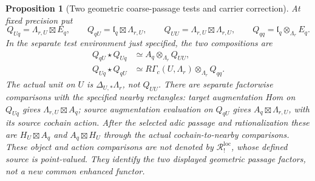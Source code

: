 \documentclass[11pt]{article}
\newtheorem{proposition}{Proposition}[section]
\theoremstyle{definition}
\theoremstyle{remark}
\begin{document}
\begin{proposition}[Two geometric coarse-passage tests and carrier correction]
\label{prop:normalized-root-passage}
At fixed precision put
\[
 Q_{Uq}=\Lambda_{r,U}\boxtimes E_q,\qquad
 Q_{qU}=\mathfrak l_q\boxtimes\Lambda_{r,U},\qquad
 Q_{UU}=\Lambda_{r,U}\boxtimes\Lambda_{r,U},\qquad
 Q_{qq}=\mathfrak l_q\otimes_{\Lambda_r}E_q.
\]
In the separate test environment just specified, the two compositions
are
\begin{align*}
 Q_{qU}\star Q_{Uq}&\simeq A_q\otimes_{\Lambda_r}Q_{UU},\\
 Q_{Uq}\star Q_{qU}&\simeq R\Gamma_c(U,\Lambda_r)
                                      \otimes_{\Lambda_r}Q_{qq}.
\end{align*}
The actual unit on $U$ is $\Delta_{U,*}\Lambda_r$, not $Q_{UU}$.
There are separate factorwise comparisons with the specified nearby
rectangles: target augmentation Hom on $Q_{Uq}$ gives
$\Lambda_{r,U}\boxtimes A_q$; source augmentation evaluation on
$Q_{qU}$ gives $A_q\boxtimes\Lambda_{r,U}$, with its source cochain
action.  After the selected adic passage and rationalization these
are $H_U\boxtimes A_q$ and $A_q\boxtimes H_U$ through the actual
cochain-to-nearby comparisons.  These object and action comparisons
are not denoted by $\mathcal R_!^{\mathrm{loc}}$, whose defined source
is point-valued.  They identify the two displayed geometric passage
factors, not a new common enhanced functor.
\end{proposition}
\end{document}
